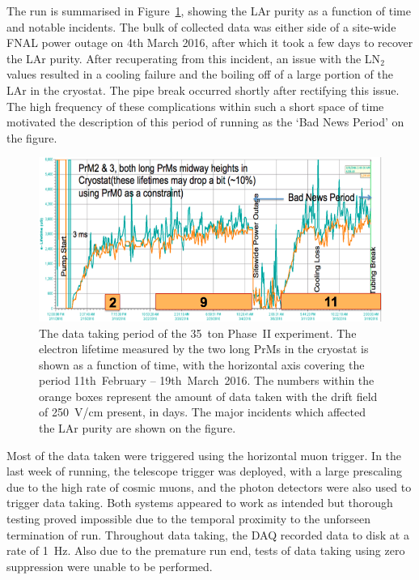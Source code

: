 The run is summarised in Figure~\ref{fig:35tonPhaseIIData}, showing the LAr purity as a function of time and notable incidents.  The bulk of collected data was either side of a site-wide FNAL power outage on 4th March 2016, after which it took a few days to recover the LAr purity.  After recuperating from this incident, an issue with the LN$_2$ values resulted in a cooling failure and the boiling off of a large portion of the LAr in the cryostat.  The pipe break occurred shortly after rectifying this issue.  The high frequency of these complications within such a short space of time motivated the description of this period of running as the `Bad News Period' on the figure.

\begin{figure}
  \centering
  \includegraphics[width=15cm]{35tonPhaseIIData.png}
  \caption[The data taking period of the 35~ton Phase~II experiment.]{The data taking period of the 35~ton Phase~II experiment.  The electron lifetime measured by the two long PrMs in the cryostat is shown as a function of time, with the horizontal axis covering the period 11th~February -- 19th~March~2016.  The numbers within the orange boxes represent the amount of data taken with the drift field of 250~V/cm present, in days.  The major incidents which affected the LAr purity are shown on the figure.}
  \label{fig:35tonPhaseIIData}
\end{figure}

Most of the data taken were triggered using the horizontal muon trigger.  In the last week of running, the telescope trigger was deployed, with a large prescaling due to the high rate of cosmic muons, and the photon detectors were also used to trigger data taking.  Both systems appeared to work as intended but thorough testing proved impossible due to the temporal proximity to the unforseen termination of run.  Throughout data taking, the DAQ recorded data to disk at a rate of 1~Hz.  Also due to the premature run end, tests of data taking using zero suppression were unable to be performed.

